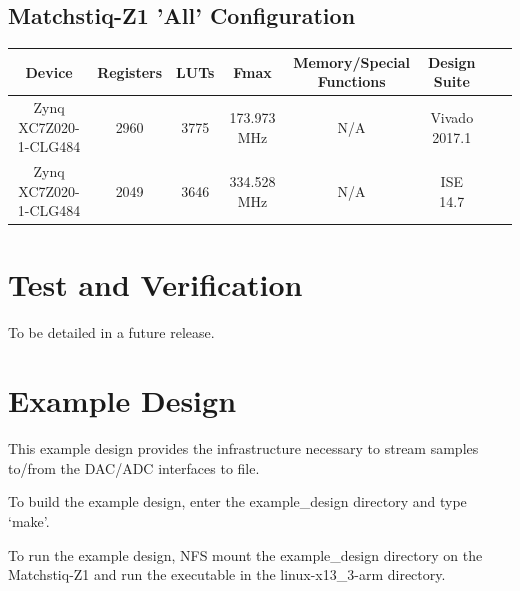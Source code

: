 \documentclass{article}
\begin{document}
\subsection*{Matchstiq-Z1 'All' Configuration}
\begin{scriptsize}
	\begin{tabular}{|c|c|c|c|c|c|c|c|}
		\hline
		\rowcolor{blue}
		Device                & Registers & LUTs & Fmax        & Memory/Special Functions & Design Suite \\
		\hline
		Zynq XC7Z020-1-CLG484 & 2960      & 3775 & 173.973 MHz & N/A                      & Vivado 2017.1    \\
		\hline
		Zynq XC7Z020-1-CLG484 & 2049      & 3646 & 334.528 MHz & N/A                      & ISE 14.7     \\
		\hline
	\end{tabular}
\end{scriptsize}

\section*{Test and Verification}
\begin{flushleft}
 To be detailed in a future release.
\end{flushleft}
\section*{Example Design}
This example design provides the infrastructure necessary to stream samples to/from the DAC/ADC interfaces to file.\par\medskip

\noindent To build the example design, enter the example\_design directory and type `make'.\par\medskip

\noindent To run the example design, NFS mount the example\_design directory on the Matchstiq-Z1 and run the executable in the linux-x13\_3-arm directory.\par\bigskip
\end{document}
